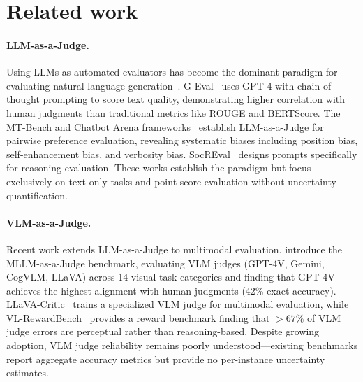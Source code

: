 \documentclass{article}
\begin{document}
\section{Related work}
\label{sec:related}

\paragraph{LLM-as-a-Judge.}
Using LLMs as automated evaluators has become the dominant paradigm for evaluating natural language generation~\citep{zheng2023judging,liu2023geval}. G-Eval~\citep{liu2023geval} uses GPT-4 with chain-of-thought prompting to score text quality, demonstrating higher correlation with human judgments than traditional metrics like ROUGE and BERTScore. The MT-Bench and Chatbot Arena frameworks~\citep{zheng2023judging} establish LLM-as-a-Judge for pairwise preference evaluation, revealing systematic biases including position bias, self-enhancement bias, and verbosity bias. SocREval~\citep{he2024soceval} designs prompts specifically for reasoning evaluation. These works establish the paradigm but focus exclusively on text-only tasks and point-score evaluation without uncertainty quantification.

\paragraph{VLM-as-a-Judge.}
Recent work extends LLM-as-a-Judge to multimodal evaluation. \citet{chen2024mllmasajudge} introduce the MLLM-as-a-Judge benchmark, evaluating VLM judges (GPT-4V, Gemini, CogVLM, LLaVA) across 14 visual task categories and finding that GPT-4V achieves the highest alignment with human judgments (42\% exact accuracy). LLaVA-Critic~\citep{xiong2024llavacritic} trains a specialized VLM judge for multimodal evaluation, while VL-RewardBench~\citep{li2024vlrewardbench} provides a reward benchmark finding that $>67\%$ of VLM judge errors are perceptual rather than reasoning-based. Despite growing adoption, VLM judge reliability remains poorly understood---existing benchmarks report aggregate accuracy metrics but provide no per-instance uncertainty estimates.
\end{document}
